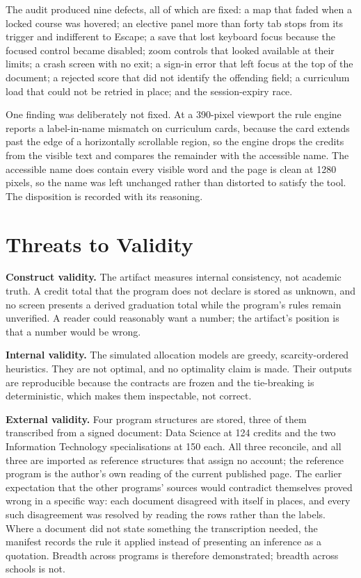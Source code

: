 The audit produced nine defects, all of which are fixed: a map that faded when a locked course was
hovered; an elective panel more than forty tab stops from its trigger and indifferent to Escape; a
save that lost keyboard focus because the focused control became disabled; zoom controls that looked
available at their limits; a crash screen with no exit; a sign-in error that left focus at the top of
the document; a rejected score that did not identify the offending field; a curriculum load that
could not be retried in place; and the session-expiry race.

One finding was deliberately not fixed. At a 390-pixel viewport the rule engine reports a
label-in-name mismatch on curriculum cards, because the card extends past the edge of a horizontally
scrollable region, so the engine drops the credits from the visible text and compares the remainder
with the accessible name. The accessible name does contain every visible word and the page is clean
at 1280 pixels, so the name was left unchanged rather than distorted to satisfy the tool. The
disposition is recorded with its reasoning.

\section{Threats to Validity}

\textbf{Construct validity.} The artifact measures internal consistency, not academic truth. A
credit total that the program does not declare is stored as unknown, and no screen presents a
derived graduation total while the program's rules remain unverified. A reader could reasonably
want a number; the artifact's position is that a number would be wrong.

\textbf{Internal validity.} The simulated allocation models are greedy, scarcity-ordered heuristics.
They are not optimal, and no optimality claim is made. Their outputs are reproducible because the
contracts are frozen and the tie-breaking is deterministic, which makes them inspectable, not
correct.

\textbf{External validity.} Four program structures are stored, three of them transcribed from a
signed document: Data Science at 124 credits and the two Information Technology specialisations at
150 each. All three reconcile, and all three are imported as reference structures that assign no
account; the reference program is the author's own reading of the current published page. The earlier
expectation that the other programs' sources would contradict themselves proved wrong in a specific
way: each document disagreed with itself in places, and every such disagreement was resolved by
reading the rows rather than the labels. Where a document did not state something the transcription
needed, the manifest records the rule it applied instead of presenting an inference as a quotation.
Breadth across programs is therefore demonstrated; breadth across schools is not.

